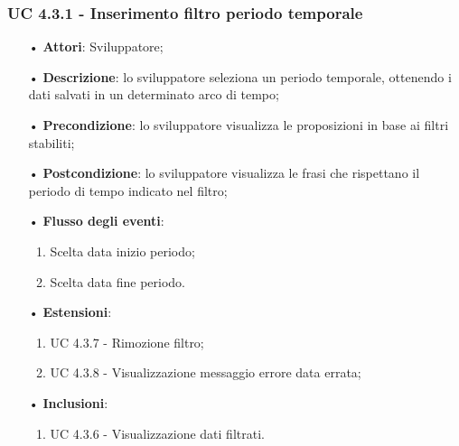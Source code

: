 \subsubsection{UC 4.3.1 - Inserimento filtro periodo temporale}
\begin{itemize}
	\item[•]\textbf{Attori}: Sviluppatore;
	\item[•]\textbf{Descrizione}: lo sviluppatore seleziona un periodo temporale, ottenendo i dati salvati in un determinato arco di tempo;
	\item[•]\textbf{Precondizione}: lo sviluppatore visualizza le proposizioni in base ai filtri stabiliti;
	\item[•]\textbf{Postcondizione}: lo sviluppatore visualizza le frasi che rispettano il periodo di tempo indicato nel filtro;
	\item[•]\textbf{Flusso degli eventi}: 
	\begin{enumerate}
		\item Scelta data inizio periodo;
		\item Scelta data fine periodo.
	\end{enumerate}
	\item[•]\textbf{Estensioni}: 
	\begin{enumerate}
		\item UC 4.3.7 - Rimozione filtro;
		\item UC 4.3.8 - Visualizzazione messaggio errore data errata;
	\end{enumerate}
	\item[•]\textbf{Inclusioni}:
	\begin{enumerate}
		\item UC 4.3.6 - Visualizzazione dati filtrati.
	\end{enumerate}
\end{itemize}


